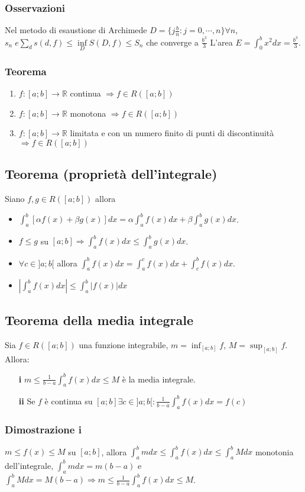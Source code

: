 \subsubsection{Osservazioni}
Nel metodo di esaustione di Archimede $D=\{j\frac{b}{n}:j=0,\cdots,n\}\forall n$, $s_n\;e \sum\limits_d s(d,f)\le \inf\limits_D S(D,f)\le S_n$ che converge a $\frac{b^3}{3}
$ L'area $E=\int_0^b x^2dx=\frac{b^3}{3}$.
\subsubsection{Teorema}
\begin{enumerate}
\item $f:[a;b]\rightarrow\mathbb{R}$ continua $\Rightarrow f\in R([a;b])$
\item $f:[a;b]\rightarrow\mathbb{R}$ monotona $\Rightarrow f\in R([a;b])$
\item $f:[a;b]\rightarrow\mathbb{R}$ limitata  e con un numero finito di punti di discontinuit\`a $\Rightarrow f\in R([a;b])$
\end{enumerate}
\subsection{Teorema (propriet\`a dell'integrale)}
Siano $f,g\in R([a;b])$ allora
\begin{itemize}
\item $\int_a^b[\alpha f(x)+\beta g(x)]dx=\alpha\int_a^b f(x)dx+\beta\int_a^bg(x)dx$.
\item $f\le g$ su $[a;b]\Rightarrow\int_a^b f(x) dx\le \int_a^b g(x) dx$.
\item $\forall c\in]a;b[$ allora $\int_a^b f(x) dx=\int_a^c f(x) dx+\int_c^b f(x) dx$.
\item $|\int_a^b f(x) dx|\le \int_a^b |f(x)| dx$
\end{itemize}
\subsection{Teorema della media integrale}
Sia $f\in R([a;b])$ una funzione integrabile, $m=\inf_{[a;b]}f$, $M=\sup_{[a;b]}f$. Allora:
\begin{itemize}
\item[\textbf{i}] $m\le \frac{1}{b-a}\int_a^b f(x)dx\le M$ \`e la media integrale.
\item[\textbf{ii}] Se $f$ \`e continua su $[a;b]\exists c\in ]a;b[:\frac{1}{b-a}\int_a^b f(x)dx=f(c)$
\end{itemize}
\subsubsection{Dimostrazione i}
$m\le f(x)\le M$ su $[a;b]$, allora $\int_a^b mdx\le \int_a^bf(x)dx\le\int_a^b Mdx$ monotonia dell'integrale, $\int_a^b mdx=m(b-a)$ e $\int_a^b Mdx=M(b-a)\Rightarrow m\le 
\frac{1}{b-a}\int_a^b f(x)dx\le M$.
